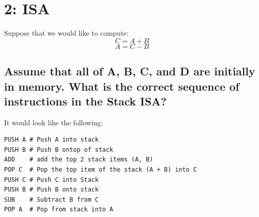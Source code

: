 \documentclass{article}
\begin{document}
\pagebreak
\section{2: ISA}
Suppose that we would like to compute:
$$ C = A + B $$
$$ A = C - B $$

\subsection{Assume that all of A, B, C, and D are initially in memory. What is the correct sequence of instructions in the Stack ISA?}
It would look like the following:
\begin{center}
	\begin{minipage}{0.7\textwidth}
		\begin{lstlisting}
PUSH A # Push A into stack
PUSH B # Push B ontop of stack
ADD    # add the top 2 stack items (A, B)
POP C  # Pop the top item of the stack (A + B) into C
PUSH C # Push C into Stack
PUSH B # Push B onto stack
SUB    # Subtract B from C 
POP A  # Pop from stack into A
\end{lstlisting}
	\end{minipage}
\end{center}
\end{document}
